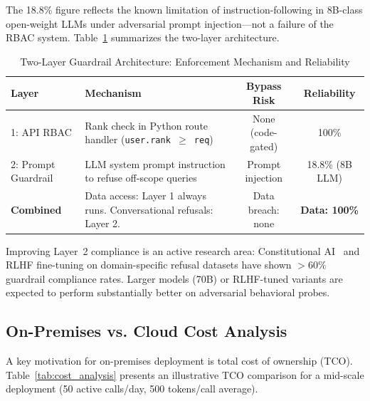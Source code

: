 \documentclass[11pt,a4paper]{article}
\begin{document}
The 18.8\% figure reflects the known limitation of instruction-following in 8B-class open-weight LLMs under adversarial prompt injection---not a failure of the RBAC system. Table~\ref{tab:guardrail_layers} summarizes the two-layer architecture.

\begin{table}[htbp]
\centering\small
\caption{Two-Layer Guardrail Architecture: Enforcement Mechanism and Reliability}
\label{tab:guardrail_layers}
\renewcommand{\arraystretch}{1.25}
\begin{tabularx}{\textwidth}{lXcc}
\toprule
\textbf{Layer} & \textbf{Mechanism} & \textbf{Bypass Risk} & \textbf{Reliability} \\
\midrule
1: API RBAC & Rank check in Python route handler (\texttt{user.rank $\ge$ req}) & None (code-gated) & 100\% \\
2: Prompt Guardrail & LLM system prompt instruction to refuse off-scope queries & Prompt injection & 18.8\% (8B LLM) \\
\midrule
\textbf{Combined} & Data access: Layer 1 always runs. Conversational refusals: Layer 2. & Data breach: none & \textbf{Data: 100\%} \\
\bottomrule
\end{tabularx}
\end{table}

Improving Layer~2 compliance is an active research area: Constitutional AI~\cite{shen2023alignment} and RLHF fine-tuning on domain-specific refusal datasets have shown $>60\%$ guardrail compliance rates. Larger models (70B) or RLHF-tuned variants are expected to perform substantially better on adversarial behavioral probes.

\subsection{On-Premises vs. Cloud Cost Analysis}
\label{subsec:cost_analysis}

A key motivation for on-premises deployment is total cost of ownership (TCO). Table~\ref{tab:cost_analysis} presents an illustrative TCO comparison for a mid-scale deployment (50 active calls/day, 500 tokens/call average).
\end{document}
